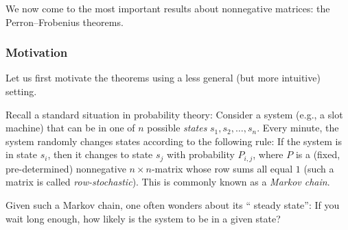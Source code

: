 \documentclass[numbers=enddot,12pt,final,onecolumn,notitlepage]{scrartcl}%
\numberwithin{exer}{subsection}
\theoremstyle{definition}
\begin{document}
We now come to the most important results about nonnegative matrices: the
Perron--Frobenius theorems.

\subsubsection{Motivation}

Let us first motivate the theorems using a less general (but more intuitive) setting.

Recall a standard situation in probability theory: Consider a system (e.g., a
slot machine) that can be in one of $n$ possible \emph{states} $s_{1}%
,s_{2},\ldots,s_{n}$. Every minute, the system randomly changes states
according to the following rule: If the system is in state $s_{i}$, then it
changes to state $s_{j}$ with probability $P_{i,j}$, where $P$ is a (fixed,
pre-determined) nonnegative $n\times n$-matrix whose row sums all equal $1$
(such a matrix is called \emph{row-stochastic}). This is commonly known as a
\emph{Markov chain}.

Given such a Markov chain, one often wonders about its \textquotedblleft
steady state\textquotedblright: If you wait long enough, how likely is the
system to be in a given state?
\end{document}
